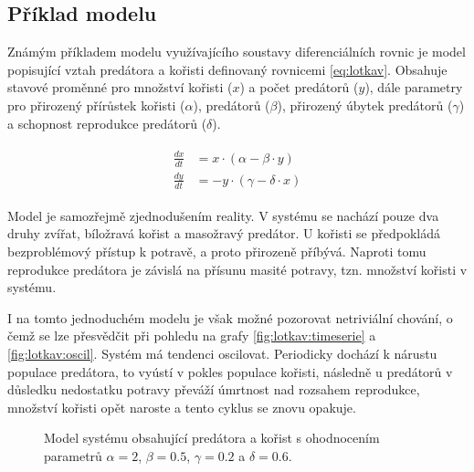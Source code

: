 
\subsection{Příklad modelu}\label{section:lotkav}

Známým příkladem modelu využívajícího soustavy diferenciálních rovnic je model popisující vztah predátora
a kořisti \cite{lotka1925} definovaný rovnicemi \ref{eq:lotkav}. Obsahuje stavové pro\-měn\-né
pro množství kořisti ($x$) a počet predátorů ($y$), dále parametry pro přirozený
přírůstek kořisti ($\alpha$),  predátorů ($\beta$), přirozený úbytek
predátorů ($\gamma$) a schopnost reprodukce predátorů ($\delta$).

\begin{align}\label{eq:lotkav}
\begin{array}{ll}
\frac{dx}{dt} &= x\cdot(\alpha - \beta \cdot y)			\\
\frac{dy}{dt} &= -y \cdot (\gamma - \delta \cdot x)
\end{array}
\end{align}

Model je samozřejmě zjednodušením reality. V systému se nachází pou\-ze dva druhy
zvířat, bíložravá kořist a masožravý predátor. U kořisti se před\-po\-klá\-dá bezproblémový
přístup k potravě, a proto přirozeně příbývá. Naproti tomu reprodukce predátora je
závislá na přísunu masité potravy, tzn. množství kořisti v systému.

I na tomto jednoduchém modelu je však možné pozorovat netriviální chování, o čemž se lze přesvědčit
při pohledu na grafy  \ref{fig:lotkav:timeserie} a \ref{fig:lotkav:oscil}. Systém má
tendenci oscilovat. Periodicky dochází k nárustu populace predátora, to vyústí v pokles
populace kořisti, následně u predátorů v důsledku nedostatku potravy převáží úmrtnost nad rozsahem reprodukce,
množství kořisti opět naroste a tento cyklus se znovu opakuje.

\begin{figure}[h!]
\begin{center}
\end{center}
\caption{Model systému obsahující predátora a kořist s ohodnocením parametrů $\alpha = 2$,  $\beta = 0.5$, $\gamma = 0.2$ a $\delta = 0.6$.}
\end{figure}

